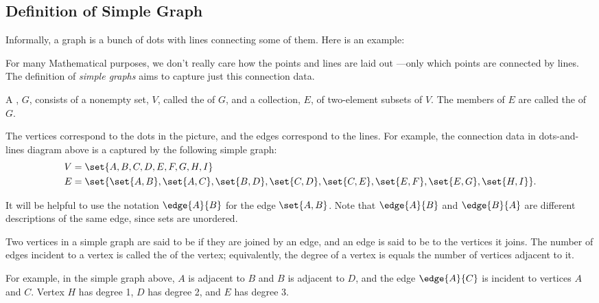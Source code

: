 \label{degreessec}

\subsection{Definition of Simple Graph}
Informally, a graph is a bunch of dots with lines connecting some of
them.  Here is an example:


For many Mathematical purposes, we don't really care how the points and
lines are laid out ---only which points are connected by lines.  The
definition of \emph{simple graphs} aims to capture just this connection
data.

\begin{definition}\label{graphdef} 
A , $G$, consists of a nonempty set, $V$, called the
 of $G$, and a collection, $E$, of two-element subsets of
$V$.  The members of $E$ are called the  of $G$.
\end{definition}
The vertices correspond to the dots in the picture, and the edges
correspond to the lines.  For example, the connection data in
dots-and-lines diagram above is a captured by the following simple graph:
\begin{align*}
V & =  \set{A, B, C, D, E, F, G, H, I} \\
E & =  \set{ \set{A, B}, \set{A, C}, \set{B, D}, \set{C, D},
              \set{C, E}, \set{E, F}, \set{E, G}, \set{H, I} }.
\end{align*}          

It will be helpful to use the notation $\edge{A}{B}$ for the edge
$\set{A,B}$.  Note that $\edge{A}{B}$ and $\edge{B}{A}$ are different
descriptions of the same edge, since sets are unordered.

\begin{definition}
Two vertices in a simple graph are said to be  if they are
joined by an edge, and an edge is said to be  to the
vertices it joins.  The number of edges incident to a vertex is called the
 of the vertex; equivalently, the degree of a vertex is
equals the number of vertices adjacent to it.
\end{definition}
For example, in the simple graph above, $A$ is adjacent to $B$ and $B$ is
adjacent to $D$, and the edge $\edge{A}{C}$ is incident to vertices $A$
and $C$.  Vertex $H$ has degree 1, $D$ has degree 2, and $E$ has degree 3.

